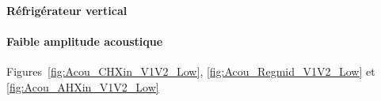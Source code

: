 %    

\paragraph{Réfrigérateur vertical}
\paragraph*{Faible amplitude acoustique} Figures~\ref{fig:Acou_CHXin_V1V2_Low}, \ref{fig:Acou_Regmid_V1V2_Low} et \ref{fig:Acou_AHXin_V1V2_Low}

%    

%    

%    

